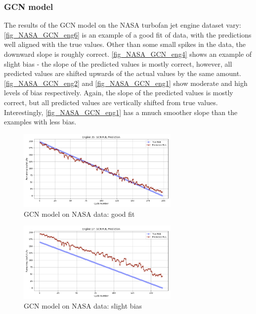 \documentclass[12pt]{article}
\begin{document}
\subsubsection{GCN model}
The results of the GCN model on the NASA turbofan jet engine dataset vary: \autoref{fig_NASA_GCN_eng6} is an example of a good fit of data, with the predictions well aligned with the true values. Other than some small spikes in the data, the downward slope is roughly correct. \autoref{fig_NASA_GCN_eng4} shows an example of slight bias - the slope of the predicted values is mostly correct, however, all predicted values are shifted upwards of the actual values by the same amount. \autoref{fig_NASA_GCN_eng2} and \autoref{fig_NASA_GCN_eng1} show moderate and high levels of bias respectively. Again, the slope of the predicted values is mostly correct, but all predicted values are vertically shifted from true values. Interestingly, \autoref{fig_NASA_GCN_eng1} has a mnuch smoother slope than the examples with less bias. 
\begin{figure}[h!]
    \centering
    \includegraphics[width=0.7\textwidth]{figures/NASA/NASA_GCN_eng6.png} 
    \caption{GCN model on NASA data: good fit}
    \label{fig_NASA_GCN_eng6}
\end{figure}

\begin{figure}[h!]
    \centering
    \includegraphics[width=0.7\textwidth]{figures/NASA/NASA_GCN_eng4.png} 
    \caption{GCN model on NASA data: slight bias}
    \label{fig_NASA_GCN_eng4}
\end{figure}
\end{document}

